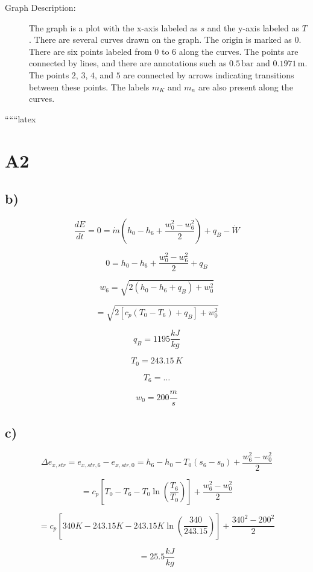 \begin{description}
    \item[Graph Description:] The graph is a plot with the x-axis labeled as $s$ and the y-axis labeled as $T$. There are several curves drawn on the graph. The origin is marked as $0$. There are six points labeled from $0$ to $6$ along the curves. The points are connected by lines, and there are annotations such as $0.5 \, \text{bar}$ and $0.1971 \, \text{m}$. The points $2$, $3$, $4$, and $5$ are connected by arrows indicating transitions between these points. The labels $m_K$ and $m_n$ are also present along the curves.
\end{description}

``````latex


\section*{A2}

\subsection*{b)}

\[
\frac{dE}{dt} = 0 = \dot{m} \left( h_0 - h_6 + \frac{w_0^2 - w_6^2}{2} \right) + q_{B} - \dot{W}
\]

\[
0 = h_0 - h_6 + \frac{w_0^2 - w_6^2}{2} + q_{B}
\]

\[
w_6 = \sqrt{2 \left( h_0 - h_6 + q_{B} \right) + w_0^2}
\]

\[
= \sqrt{2 \left[ c_p (T_0 - T_6) + q_{B} \right] + w_0^2}
\]

\[
q_{B} = 1195 \frac{kJ}{kg}
\]

\[
T_0 = 243.15 \, K
\]

\[
T_6 = \ldots
\]

\[
w_0 = 200 \frac{m}{s}
\]

\subsection*{c)}

\[
\Delta e_{x,str} = e_{x,str,6} - e_{x,str,0} = h_6 - h_0 - T_0 (s_6 - s_0) + \frac{w_6^2 - w_0^2}{2}
\]

\[
= c_p \left[ T_0 - T_6 - T_0 \ln \left( \frac{T_6}{T_0} \right) \right] + \frac{w_6^2 - w_0^2}{2}
\]

\[
= c_p \left[ 340K - 243.15K - 243.15K \ln \left( \frac{340}{243.15} \right) \right] + \frac{340^2 - 200^2}{2}
\]

\[
= 25.5 \frac{kJ}{kg}
\]

